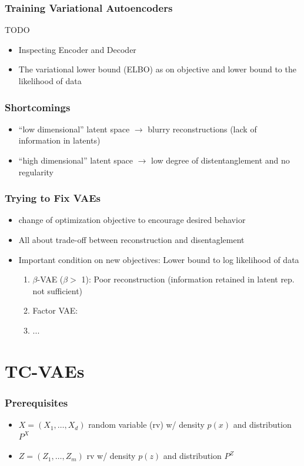 \documentclass{beamer}
\theoremstyle{definition}
\begin{document}
    \begin{frame}
      \frametitle{Training Variational Autoencoders}
      TODO
     \begin{itemize}
       \item Inspecting Encoder and Decoder
          \item The variational lower bound (ELBO) as on objective and lower bound to the likelihood of data
     \end{itemize}
    \end{frame}

    \begin{frame}
      \frametitle{Shortcomings}
      \begin{itemize}
        \item \enquote{low dimensional} latent space $\to$ blurry reconstructions (lack of information in latents)
        \item \enquote{high dimensional} latent space $\to$ low degree of distentanglement and no regularity
      \end{itemize}
    \end{frame}


    \begin{frame}
      \frametitle{Trying to Fix VAEs}
      \begin{itemize}
        \item change of optimization objective to encourage desired behavior
        \item All about trade-off between reconstruction and disentaglement
        \item Important condition on new objectives: Lower bound to log likelihood of data
        \begin{enumerate}
          \item $\beta$-VAE ($\beta > $ 1): Poor reconstruction (information retained in latent rep. not sufficient)
          \item Factor VAE:
          \item ...
        \end{enumerate}
      \end{itemize}
    \end{frame}


    \section{TC-VAEs}
    \begin{frame}
      \frametitle{Prerequisites}
      \begin{itemize}
        \item $X = (X_{1}, \dots, X_{d})$ random variable (rv) w/ density $p(x)$ and distribution $P^{X}$
        \item $Z = (Z_{1}, \dots, Z_{m})$ rv w/ density $p(z)$ and distribution $P^{Z}$
      \end{itemize}
    \end{frame}
\end{document}
